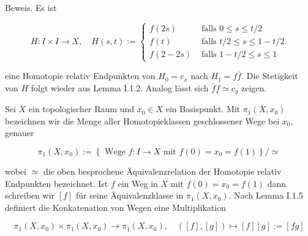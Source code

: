 \documentclass[10pt]{article}
\begin{document}
Beweis. Es ist

$$
H: I \times I \rightarrow X, \quad H(s, t):= \begin{cases}f(2 s) & \text { falls } 0 \leq s \leq t / 2 \\ f(t) & \text { falls } t / 2 \leq s \leq 1-t / 2 \\ f(2-2 s) & \text { falls } 1-t / 2 \leq s \leq 1\end{cases}
$$

eine Homotopie relativ Endpunkten von $H_{0}=c_{x}$ nach $H_{1}=f \bar{f}$. Die Stetigkeit von $H$ folgt wieder aus Lemma I.1.2. Analog lässt sich $\bar{f} f \simeq c_{y}$ zeigen.

Sei $X$ ein topologischer Raum und $x_{0} \in X$ ein Basispunkt. Mit $\pi_{1}\left(X, x_{0}\right)$ bezeichnen wir die Menge aller Homotopieklassen geschlossener Wege bei $x_{0}$, genauer

$$
\pi_{1}\left(X, x_{0}\right):=\left\{\text { Wege } f: I \rightarrow X \text { mit } f(0)=x_{0}=f(1)\right\} / \simeq
$$

wobei $\simeq$ die oben besprochene Äquivalenzrelation der Homotopie relativ Endpunkten bezeichnet. Ist $f$ ein Weg in $X$ mit $f(0)=x_{0}=f(1)$ dann schreiben wir $[f]$ für seine Äquivalenzklasse in $\pi_{1}\left(X, x_{0}\right)$. Nach Lemma I.1.5 definiert die Konkatenation von Wegen eine Multiplikation

$$
\pi_{1}\left(X, x_{0}\right) \times \pi_{1}\left(X, x_{0}\right) \rightarrow \pi_{1}\left(X, x_{0}\right), \quad([f],[g]) \mapsto[f][g]:=[f g]
$$
\end{document}
